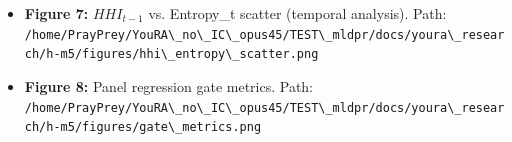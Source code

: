\begin{itemize}
\item \textbf{Figure 7:} $HHI_{t-1}$ vs. Entropy\_t scatter (temporal analysis). Path: \texttt{/home/PrayPrey/YouRA\textbackslash \_no\textbackslash \_IC\textbackslash \_opus45/TEST\textbackslash \_mldpr/docs/youra\textbackslash \_research/h-m5/figures/hhi\textbackslash \_entropy\textbackslash \_scatter.png}
\end{itemize}

\begin{itemize}
\item \textbf{Figure 8:} Panel regression gate metrics. Path: \texttt{/home/PrayPrey/YouRA\textbackslash \_no\textbackslash \_IC\textbackslash \_opus45/TEST\textbackslash \_mldpr/docs/youra\textbackslash \_research/h-m5/figures/gate\textbackslash \_metrics.png}
\end{itemize}
